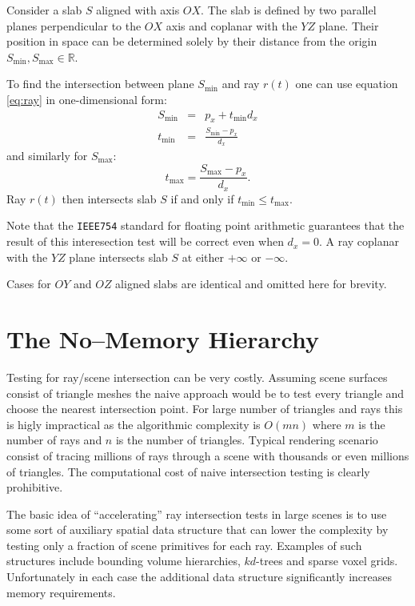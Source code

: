 Consider a slab $S$ aligned with axis $OX$. The slab is defined by two parallel planes perpendicular to the $OX$ axis and coplanar with the $YZ$ plane. Their position in space can be determined solely by their distance from the origin $S_{\min}, S_{\max} \in \mathbb{R}$.

To find the intersection between plane $S_{\min}$ and ray $r(t)$ one can use equation \ref{eq:ray} in one-dimensional form:
\begin{eqnarray}
  S_{\min} &=& p_{x} + t_{\min} d_{x} \nonumber \\
  t_{\min} &=& \frac{S_{\min} - p_{x}}{d_{x}}
\end{eqnarray}
and similarly for $S_{\max}$:
\begin{equation}
  t_{\max} = \frac{S_{\max} - p_{x}}{d_{x}}.
\end{equation}
Ray $r(t)$ then intersects slab $S$ if and only if $t_{\min} \le t_{\max}$.

Note that the \texttt{IEEE754} standard for floating point arithmetic guarantees that the result of this interesection test will be correct even when $d_{x}=0$. A ray coplanar with the $YZ$ plane intersects slab $S$ at either $+\infty$ or $-\infty$.

Cases for $OY$ and $OZ$ aligned slabs are identical and omitted here for brevity.

\section{The No--Memory Hierarchy}
\label{sec:nmh}
Testing for ray/scene intersection can be very costly. Assuming scene surfaces consist of triangle meshes the naive approach would be to test every triangle and choose the nearest intersection point. For large number of triangles and rays this is higly impractical as the algorithmic complexity is $O(mn)$ where $m$ is the number of rays and $n$ is the number of triangles. Typical rendering scenario consist of tracing millions of rays through a scene with thousands or even millions of triangles. The computational cost of naive intersection testing is clearly prohibitive.

The basic idea of ``accelerating'' ray intersection tests in large scenes is to use some sort of auxiliary spatial data structure that can lower the complexity by testing only a fraction of scene primitives for each ray. Examples of such structures include bounding volume hierarchies, $kd$-trees and sparse voxel grids. Unfortunately in each case the additional data structure significantly increases memory requirements.

